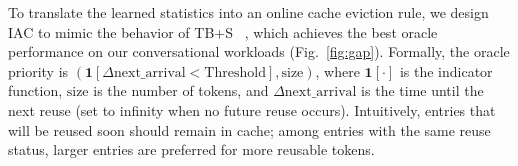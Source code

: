 \documentclass{article}
\newcommand{\bo}[1]{\textcolor{red}{[Bo: #1]}}
\begin{document}
To translate the learned statistics into an online cache eviction rule, we design IAC to mimic the behavior of TB+S%
~\cite{246346}, which achieves the best oracle performance on our conversational workloads (Fig.~\ref{fig:gap}). Formally, the oracle priority is \(\left(\mathbf{1}[\Delta \text{next\_arrival} < \text{Threshold}], \text{size}\right)\),
where \(\mathbf{1}[\cdot]\) is the indicator function, \(\text{size}\) is the number of tokens, and \(\Delta \text{next\_arrival}\) is the time until the next reuse (set to infinity when no future reuse occurs). %
Intuitively, entries that will be reused soon should remain in cache; among entries with the same reuse status, larger entries are preferred for more reusable tokens.
\end{document}
